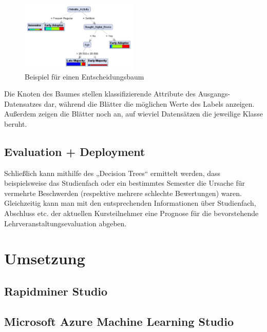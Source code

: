 \begin{figure}[htb]
  \center
	\includegraphics[width=0.5\textwidth]{gfx/dt.png}
	\caption{Beispiel für einen Entscheidungsbaum \cite{North:2012}}
	\label{fig:example:data:mod:dt}
\end{figure}

Die Knoten des Baumes stellen klassifizierende Attribute des Ausgangs-Datensatzes
dar, während die Blätter die möglichen Werte des Labels anzeigen. Außerdem
zeigen die Blätter noch an, auf wieviel Datensätzen die jeweilige Klasse beruht.

\subsection{Evaluation + Deployment}
\label{sec:example:data:eval}

Schließlich kann mithilfe des „Decision Trees“ ermittelt werden, dass
beispielsweise das Studienfach oder ein bestimmtes Semester die Ursache für
vermehrte Beschwerden (respektive mehrere schlechte Bewertungen) waren.
Gleichzeitig kann man mit den entsprechenden Informationen über Studienfach,
Abschluss etc. der aktuellen Kursteilnehmer eine Prognose für die bevorstehende
Lehrveranstaltungsevaluation abgeben.

\section{Umsetzung}
\label{sec:example:impl}

\subsection{Rapidminer Studio}
\label{sec:example:impl:rm}

\subsection{Microsoft Azure Machine Learning Studio}
\label{sec:example:impl:msa}
